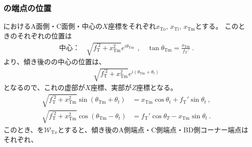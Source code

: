 \subsubsection{\TopCurvedOutcut の端点の位置}
\TopEndFace におけるA面側・C面側・中心の$X$座標をそれぞれ$x_\mathrm{To}$, $x_\mathrm{Ti}$, $x_\mathrm{Tm}$とする。
このとき\TopEndFace のそれぞれの位置は
\begin{align}
  \text{中心：}\quad
  \sqrt{f_\mathrm T^{'2}+x_\mathrm{Tm}^2}e^{i\theta_\mathrm{Tm}}~~, \quad
  \tan\theta_\mathrm{Tm} = \frac{x_\mathrm{Tm}}{f_\mathrm T'}\ .
\end{align}
より、傾き後の\nameTopEndFace の中心の位置は、
\begin{align*}
  \sqrt{f_\mathrm T^{'2}+x_\mathrm{Tm}^2}e^{i(\theta_\mathrm{Tm}+\theta_t)}
\end{align*}
となるので、これの虚部が$X$座標、実部が$Z$座標となる。
\begin{align*}
  \sqrt{f_\mathrm T^{'2}+x_\mathrm{Tm}^2}\sin(\theta_\mathrm{Tm}+\theta_t)
  &= x_\mathrm{Tm}\cos\theta_t+f_\mathrm T'\sin\theta_t~,\\
  \sqrt{f_\mathrm T^{'2}+x_\mathrm{Tm}^2}\cos(\theta_\mathrm{Tm}-\theta_t)
  &= f_\mathrm T'\cos\theta_T-x_\mathrm{Tm}\sin\theta_t~.
\end{align*}
このとき、\TopOutcutACwidth を$\mathcal W_{\mathrm Tx}$とすると、傾き後のA側端点・C側端点・BD側コーナー端点はそれぞれ、
